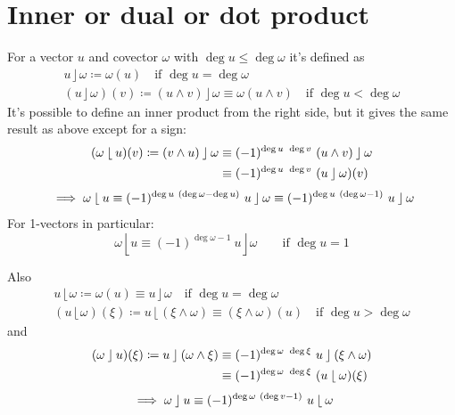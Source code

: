 \documentclass[\ifafour a4paper,12pt,\else a5paper,10pt,\fi%
onecolumn,oneside,article,%
british%
]{memoir}
\theoremstyle{remark}
\theoremstyle{innote}
\newcommand*{\defd}{\coloneqq}
\renewcommand*{\le}{\leqslant}%
\renewcommand*{\|}[1][]{\nonscript\,#1\vert\nonscript\;\mathopen{}}
\newcommand*{\ii}{\mathbin{\rfloor}}
\newcommand*{\rii}{\mathbin{\lfloor}}
\begin{document}
\section{Inner or dual or dot product}
\label{sec:inner_product}

For a vector $u$ and covector $\omega$ with $\deg u \le \deg\omega$ it's
defined as
\begin{equation}
  \label{eq:inner_prod}
  \begin{gathered}
    u \ii \omega \defd \omega(u) \quad\text{if } \deg u=\deg\omega
\\
(u \ii \omega)(v) \defd (u\land v)\ii \omega \equiv \omega(u \land v)
 \quad\text{if } \deg u < \deg\omega
  \end{gathered}
\end{equation}
It's possible to define an inner product from the right side, but it gives
the same result as above except for a sign:
\begin{equation}
  \label{eq:right_inner_prod}
\begin{gathered}
  \begin{aligned}
  (\omega \rii u)(v) \defd (v\land u)\ii \omega
  &\equiv (-1)^{\deg u\ \deg v}\ (u\land v)\ii \omega
  \\&\equiv (-1)^{\deg u\ \deg v}\ (u \ii \omega)(v)
  \end{aligned}
  \\[\jot]
  {}\implies
\omega \rii u \equiv (-1)^{\deg u\ (\deg\omega-\deg u)}\ 
u \ii \omega \equiv (-1)^{\deg u\ (\deg\omega-1)}\ 
u \ii \omega
\end{gathered}
\end{equation}
For 1-vectors in particular:
\begin{equation}
  \label{eq:right_inner_equiv_1vector}
  \omega \rii u \equiv (-1)^{\deg\omega-1}\ 
  u \ii \omega
  \qquad\text{if }\deg u = 1
\end{equation}

Also
\begin{equation}
  \label{eq:ext_inner_prod}
  \begin{gathered}
    u \rii \omega \defd \omega(u) \equiv u \ii \omega \quad\text{if } \deg u=\deg\omega
\\
(u \rii \omega)(\xi) \defd u\rii(\xi\land \omega) \equiv (\xi\land\omega)(u)
\quad\text{if } \deg u > \deg\omega
\end{gathered}
\end{equation}
and
\begin{equation}
  \label{eq:ext_right_inner_prod}
\begin{gathered}
  \begin{aligned}
    (\omega\ii u)(\xi) \defd
    u\ii (\omega \land \xi)
  &\equiv (-1)^{\deg \omega\ \deg \xi}\ u\ii (\xi \land \omega)
  \\&\equiv (-1)^{\deg \omega\ \deg \xi}\ (u \rii \omega)(\xi)
  \end{aligned}
  \\[\jot]
  {}\implies
  \omega\ii u \equiv (-1)^{\deg \omega\ (\deg v-1)}\ 
u \rii \omega
\end{gathered}
\end{equation}
\end{document}
